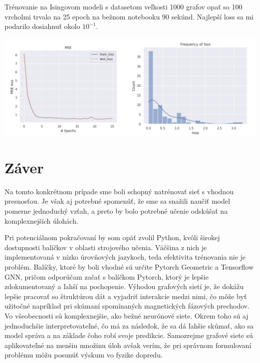 \documentclass{article}
\begin{document}
Trénovanie na Isingovom modeli s datasetom veľkosti 1000 grafov opať so 100 vrcholmi trvalo na 25 epoch na bežnom notebooku 90 sekúnd. Najlepší loss sa mi podarilo dosiahnuť okolo $10^{-1}$.

\begin{center}
    \includegraphics*[scale=0.28]{heisenberg_path.png}
\end{center}


\section*{Záver}
Na tomto konkrétnom prípade sme boli schopný natrénovať sieť s vhodnou presnosťou. Je však aj potrebné spomenúť, že sme sa snažili naučiť model pomerne jednoduchý vzťah, a preto by bolo potrebné učenie odskúšať na komplexnejších úlohách.

\newblock

Pri potenciálnom pokračovaní by som opäť zvolil Python, kvôli širokej dostupnosti balíčkov v oblasti strojového učenia. Väčšina z nich je implementovaná v nízko úrovňových jazykoch, teda efektivita trénovania nie je problém. Balíčky, ktoré by boli vhodné sú určite Pytorch Geometric a Tensorflow GNN, pričom odporúčam začať s balíčkom Pytorch, ktorý je lepšie zdokumentovaný a ľahší na pochopenie. Výhodou grafových sietí je, že dokážu lepšie pracovať so štruktúrou dát a vyjadriť interakcie medzi nimi, čo môže byť užitočné napríklad pri skúmaní spomínaných magnetických fázových prechodov. Vo všeobecnosti sú komplexnejšie, ako bežné neurónové siete. Okrem toho sú aj jednoduchšie interpretovateľné, čo má za následok, že sa dá ľahšie skúmať, ako sa model správa a na základe čoho robí svoje predikcie. Samozrejme grafové siete sú aplikovateľné na menšiu množinu úloh avšak verím, že pri správnom formulovaní problému môžu posunúť výskum vo fyzike dopredu.



\end{document}
